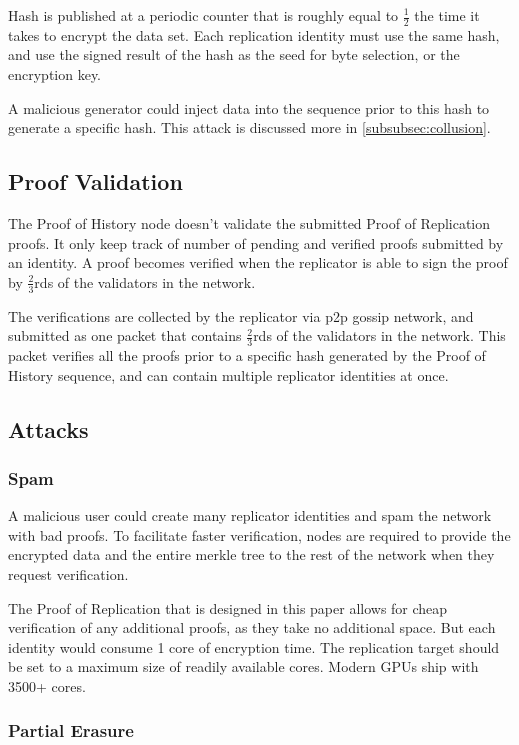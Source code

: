 \documentclass[12pt]{article}
\begin{document}
Hash is published at a periodic counter that is roughly equal to \(\frac{1}{2}\) the time it takes to encrypt the data set.  Each replication identity must use the same hash, and use the signed result of the hash as the seed for byte selection, or the encryption key.

A malicious generator could inject data into the sequence prior to this hash to generate a specific hash.  This attack is discussed more in \ref{subsubsec:collusion}.

\subsection{Proof Validation}
The Proof of History node doesn’t validate the submitted Proof of Replication proofs.  It only keep track of number of pending and verified proofs submitted by an identity.  A proof becomes verified when the replicator is able to sign the proof by \(\frac{2}{3}\)rds of the validators in the network.  

The verifications are collected by the replicator via p2p gossip network, and submitted as one packet that contains \(\frac{2}{3}\)rds of the validators in the network.  This packet verifies all the proofs prior to a specific hash generated by the Proof of History sequence, and can contain multiple replicator identities at once.
\subsection{Attacks}
\subsubsection{Spam}
A malicious user could create many replicator identities and spam the network with bad proofs.  To facilitate faster verification, nodes are required to provide the encrypted data and the entire merkle tree to the rest of the network when they request verification.

The Proof of Replication that is designed in this paper allows for cheap verification of any additional proofs, as they take no additional space.  But each identity would consume 1 core of encryption time.  The replication target should be set to a maximum size of readily available cores.  Modern GPUs ship with 3500+ cores.

\subsubsection{Partial Erasure}
\end{document}
